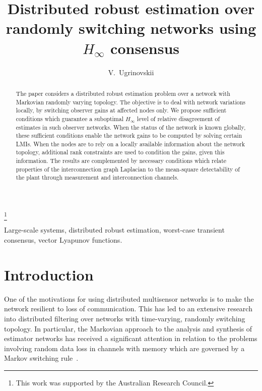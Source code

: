 \documentclass[a4paper,twocolumn]{autart}
\begin{document}
\begin{frontmatter}

\title{Distributed robust estimation over
  randomly switching networks using $H_\infty$ consensus}


\thanks[footnoteinfo]{This work was supported by the Australian
  Research Council.}

\author[First]{V.~Ugrinovskii} 

\address[First]{School of Engineering and IT, University of NSW
  at the 
  Australian Defence Force Academy, Canberra, ACT, 2600, Australia}

          
\begin{keyword}                           Large-scale systems, distributed robust estimation, worst-case transient
consensus, vector Lyapunov functions.    
\end{keyword}

\begin{abstract} 
 The paper considers a distributed robust estimation problem over a network
 with Markovian randomly varying topology. The objective is to deal with
 network variations
 locally, by switching observer gains at affected nodes only. 
 We propose sufficient conditions which guarantee a suboptimal $H_\infty$
 level of relative disagreement of estimates in such observer networks. When the
 status of the network is known globally, these sufficient conditions enable the
 network gains to be computed by solving certain LMIs. When the nodes are
 to rely on a locally available information about the network topology,
 additional rank constraints are used to condition the gains, given this
 information. The results are complemented by necessary conditions which relate
 properties of the interconnection graph Laplacian to the mean-square
 detectability of the 
 plant through measurement and interconnection channels. 
 
\end{abstract}

\end{frontmatter}

\section{Introduction}

One of the motivations for using distributed multisensor networks is to make
the network resilient to loss of communication. This has led to an
extensive research into 
distributed filtering over networks with time-varying,
randomly switching topology. 
In particular, 
the Markovian approach to the analysis and synthesis of 
estimator networks has received a significant attention in relation to the
problems involving random data loss in channels 
with memory which are governed
by a Markov
switching rule~\cite{SS-2009,MMB-2009}. 
\end{document}

